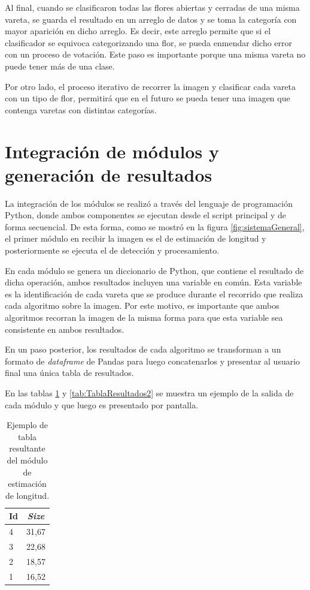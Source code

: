Al final, cuando se clasificaron todas las flores abiertas y cerradas de una misma vareta, se guarda el resultado en un arreglo de datos y se toma la categoría con mayor aparición en dicho arreglo. Es decir, este arreglo permite que si el clasificador se equivoca categorizando una flor, se pueda enmendar dicho error con un proceso de votación. Este paso es importante porque una misma vareta no puede tener más de una clase. 

Por otro lado, el proceso iterativo de recorrer la imagen y clasificar cada vareta con un tipo de flor, permitirá que en el futuro se pueda tener una imagen que contenga varetas con distintas categorías.

\section{Integración de módulos y generación de resultados}

La integración de los módulos se realizó a través del lenguaje de programación Python, donde ambos componentes se ejecutan desde el script principal y de forma secuencial. De esta forma, como se mostró en la figura \ref{fig:sistemaGeneral}, el primer módulo en recibir la imagen es el de estimación de longitud y posteriormente se ejecuta el de detección y procesamiento.

En cada módulo se genera un diccionario de Python, que contiene el resultado de dicha operación, ambos resultados incluyen una variable en común. Esta variable es la identificación de cada vareta que se produce durante el recorrido que realiza cada algoritmo sobre la imagen. Por este motivo, es importante que ambos algoritmos recorran la imagen de la misma forma para que esta variable sea consistente en ambos resultados.

En un paso posterior, los resultados de cada algoritmo se transforman a un formato de \textit{dataframe} de Pandas para luego concatenarlos y presentar al usuario final una única tabla de resultados.

En las tablas \ref{tab:TablaResultados1} y \ref{tab:TablaResultados2} se muestra un ejemplo de la salida de cada módulo y que luego es presentado por pantalla.

\begin{table}[h]
	\centering
	\caption{Ejemplo de tabla resultante del módulo de estimación de longitud.}
	\begin{tabular}{l c}    
		\toprule
		\textbf{Id}     & \textbf{\textit{Size}}\\
		\midrule
		4               &  31,67\\
		3               &  22,68\\
		2               &  18,57 \\
		1               &  16,52 \\	
		\bottomrule
		\hline
	\end{tabular}
	\label{tab:TablaResultados1}
\end{table} 

